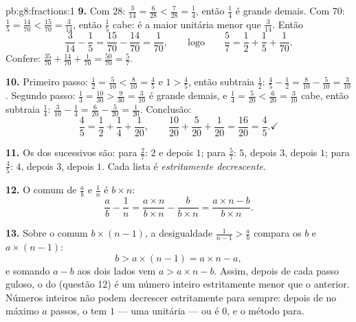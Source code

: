 \begin{solution}{pb:g8:fractions:1}
\textbf{9.} Com  $28$: $\frac{3}{14} = \frac{6}{28} <
\frac{7}{28} = \frac14$, então $\frac14$ é grande demais. Com
 $70$: $\frac15 = \frac{14}{70} < \frac{15}{70} =
\frac{3}{14}$, então $\frac15$ cabe: é a maior  unitária menor
que $\frac{3}{14}$. Então
\[
\frac{3}{14} - \frac15 = \frac{15}{70} - \frac{14}{70}
= \frac{1}{70},
\qquad\text{logo}\qquad
\frac57 = \frac12 + \frac15 + \frac{1}{70} .
\]
Confere: $\frac{35}{70} + \frac{14}{70} + \frac{1}{70} =
\frac{50}{70} = \frac57$.

\textbf{10.} Primeiro passo: $\frac12 = \frac{5}{10} < \frac{8}{10} =
\frac45$ e $1 > \frac45$, então subtraia $\frac12$:
$\frac45 - \frac12 = \frac{8}{10} - \frac{5}{10} = \frac{3}{10}$.
Segundo passo: $\frac13 = \frac{10}{30} > \frac{9}{30} = \frac{3}{10}$
é grande demais, e $\frac14 = \frac{5}{20} < \frac{6}{20} =
\frac{3}{10}$ cabe, então subtraia $\frac14$:
$\frac{3}{10} - \frac14 = \frac{6}{20} - \frac{5}{20} =
\frac{1}{20}$. Conclusão:
\[
\frac45 = \frac12 + \frac14 + \frac{1}{20},
\qquad
\frac{10}{20} + \frac{5}{20} + \frac{1}{20} = \frac{16}{20}
= \frac45 . \checkmark
\]

\textbf{11.} Os  dos  sucessivos são: para $\frac27$:
$2$ e depois $1$; para $\frac57$: $5$, depois $3$, depois $1$; para
$\frac45$: $4$, depois $3$, depois $1$. Cada lista é
\emph{estritamente decrescente}.

\textbf{12.} O  comum de $\frac ab$ e $\frac1n$ é
$b \times n$:
\[
\frac{a}{b} - \frac{1}{n}
= \frac{a \times n}{b \times n} - \frac{b}{b \times n}
= \frac{a \times n - b}{b \times n} .
\]

\textbf{13.} Sobre o  comum $b \times (n-1)$, a
desigualdade $\frac{1}{n-1} > \frac ab$ compara os  $b$ e
$a \times (n - 1)$:
\[
b > a \times (n - 1) = a \times n - a ,
\]
e somando $a - b$ aos dois lados vem $a > a \times n - b$. Assim,
depois de cada passo guloso, o  do  (questão 12) é um
número inteiro estritamente menor que o anterior. Números inteiros não
podem decrescer estritamente para sempre: depois de no máximo $a$
passos, o  tem  $1$ --- uma  unitária --- ou é $0$,
e o método para.


\end{solution}

